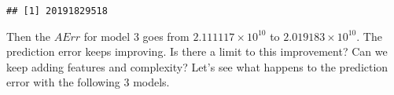 \begin{Shaded}
\begin{Highlighting}[]
\OperatorTok{~}\OperatorTok{+}\OperatorTok{+}\OperatorTok{+}\OperatorTok{+}\OperatorTok{+}
\StringTok{                }\OperatorTok{+}\OperatorTok{+}\OperatorTok{+}\OperatorTok{+}\OperatorTok{+}\OperatorTok{+}\OperatorTok{+}
\StringTok{                }\OperatorTok{+}\OperatorTok{+}\OperatorTok{+}
\OperatorTok{$}
\OperatorTok{-}\OperatorTok{^}\NormalTok{))}
\end{Highlighting}
\end{Shaded}

\begin{verbatim}
## [1] 20191829518
\end{verbatim}

Then the $AErr$ for model 3 goes from \ensuremath{2.111117\times 10^{10}}
to \ensuremath{2.019183\times 10^{10}}. The prediction error keeps improving. Is there a limit to this improvement? Can we keep adding features and complexity? Let's see what happens to the prediction error with the following 3 models. 

